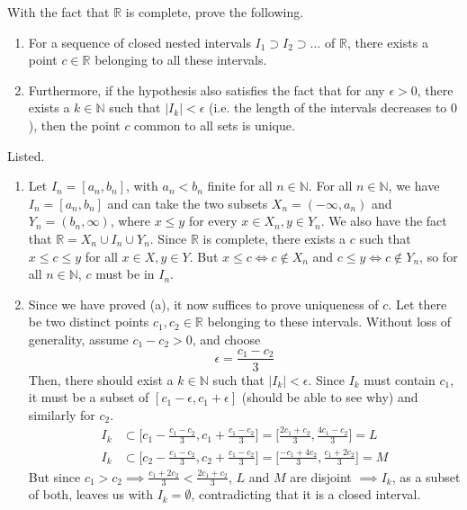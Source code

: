 \documentclass{article}
\begin{document}
    \begin{exercise}
    With the fact that $\mathbb{R}$ is complete, prove the following. 
    \begin{enumerate}
        \item For a sequence of closed nested intervals $I_1 \supset I_2 \supset \ldots$ of $\mathbb{R}$, there exists a point $c \in \mathbb{R}$ belonging to all these intervals. 
        \item Furthermore, if the hypothesis also satisfies the fact that for any $\epsilon > 0$, there exists a $k \in \mathbb{N}$ such that $|I_k| < \epsilon$ (i.e. the length of the intervals decreases to $0$), then the point $c$ common to all sets is unique. 
    \end{enumerate}
    \end{exercise}

    \begin{solution}
    Listed. 
    \begin{enumerate}
        \item Let $I_n = [a_n, b_n]$, with $a_n < b_n$ finite for all $n \in \mathbb{N}$. For all $n\in \mathbb{N}$, we have $I_n = [a_n, b_n]$ and can take the two subsets $X_n = (-\infty, a_n)$ and $Y_n = (b_n, \infty)$, where $x \leq y$ for every $x \in X_n, y \in Y_n$. We also have the fact that $\mathbb{R} = X_n \cup I_n \cup Y_n$. Since $\mathbb{R}$ is complete, there exists a $c$ such that $x \leq c \leq y$ for all $x \in X, y \in Y$. But $x \leq c \iff c \not\in X_n$ and $c \leq y \iff c \not\in Y_n$, so for all $n \in \mathbb{N}$, $c$ must be in $I_n$. 
        
        \item Since we have proved (a), it now suffices to prove uniqueness of $c$. Let there be two distinct points $c_1, c_2 \in \mathbb{R}$ belonging to these intervals. Without loss of generality, assume $c_1 - c_2 > 0$, and choose 
        \[\epsilon = \frac{c_1 - c_2}{3}\]
        Then, there should exist a $k \in \mathbb{N}$ such that $|I_k| < \epsilon$. Since $I_k$ must contain $c_1$, it must be a subset of $[c_1 - \epsilon, c_1 + \epsilon]$ (should be able to see why) and similarly for $c_2$. 
        \begin{align*}
            I_k & \subset \bigg[ c_1 - \frac{c_1 - c_2}{3}, c_1 + \frac{c_1 - c_2}{3} \bigg] = \bigg[ \frac{2c_1 + c_2}{3}, \frac{4c_1 - c_2}{3} \bigg] = L\\
            I_k & \subset \bigg[ c_2 - \frac{c_1 - c_2}{3}, c_2 + \frac{c_1 - c_2}{3} \bigg] = \bigg[ \frac{-c_1 + 4 c_2}{3}, \frac{c_1 + 2c_2}{3} \bigg] = M
        \end{align*}
        But since $c_1 > c_2 \implies \frac{c_1 + 2c_2}{3} < \frac{2c_1 + c_2}{3}$, $L$ and $M$ are disjoint $\implies I_k$, as a subset of both, leaves us with $I_k = \emptyset$, contradicting that it is a closed interval. 
    \end{enumerate}
    \end{solution}
\end{document}
